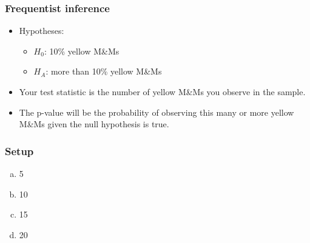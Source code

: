 \documentclass[slidestop,compress,mathserif,12pt,t,professionalfonts,xcolor=table]{beamer}
\begin{document}
\begin{frame}
\frametitle{Frequentist inference}

\begin{itemize}

\item Hypotheses:
\begin{itemize}
\item $H_0$: 10\% yellow M\&Ms
\item $H_A$: more than 10\% yellow M\&Ms 
\end{itemize}

\item Your test statistic is the number of yellow M\&Ms you observe in the sample. 

\item The p-value will be the probability of observing this many or more yellow M\&Ms given the null hypothesis is true.

\end{itemize}

\end{frame}


\begin{frame}
\frametitle{Setup}


\begin{multicols}{4}
\begin{enumerate}[(a)]
\item 5
\item 10
\item 15
\item 20
\end{enumerate}
\end{multicols}

\pause


\end{frame}

\end{document}
